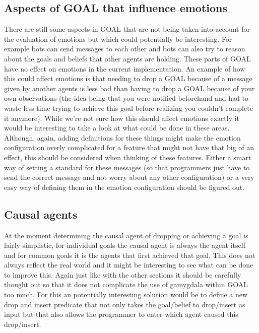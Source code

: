 \documentclass[]{article}
\begin{document}
\subsection{Aspects of GOAL that influence emotions}
There are still some aspects in GOAL that are not being taken into account for the evaluation of emotions but which could potentially be interesting. For example bots can send messages to each other and bots can also try to reason about the goals and beliefs that other agents are holding. These parts of GOAL have no effect on emotions in the current implementation. An example of how this could affect emotions is that needing to drop a GOAL because of a message given by another agents is less bad than having to drop a GOAL because of your own observations (the idea being that you were notified beforehand and had to waste less time trying to achieve this goal before realizing you couldn't complete it anymore). While we're not sure how this should affect emotions exactly it would be interesting to take a look at what could be done in these areas. Although, again, adding definitions for these things might make the emotion configuration overly complicated for a feature that might not have that big of an effect, this should be considered when thinking of these features. Either a smart way of setting a standard for these messages (so that programmers just have to send the correct message and not worry about any other configuration) or a very easy way of defining them in the emotion configuration should be figured out.

\subsection{Causal agents}
At the moment determining the causal agent of dropping or achieving a goal is fairly simplistic, for individual goals the causal agent is always the agent itself and for common goals it is the agents that first achieved that goal. This does not always reflect the real world and it might be interesting to see what can be done to improve this. Again just like with the other sections it should be carefully thought out so that it does not complicate the use of gamygdala within GOAL too much. For this an potentially interesting solution would be to define a new drop and insert predicate that not only takes the goal/belief to drop/insert as input but that also allows the programmer to enter which agent caused this drop/insert.
\end{document}
